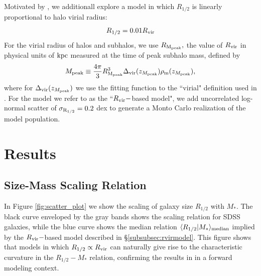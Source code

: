 \documentclass[usenatbib,usegraphicx,letterpaper]{mn2e}
\newcommand{\beq}{\begin{equation}}
\newcommand{\eeq}{\end{equation}}
\newcommand{\rhalf}{R_{1/2}}
\newcommand{\sigmarhalf}{\sigma_{\rm R_{1/2}}}
\newcommand{\mstar}{M_{\ast}}
\newcommand{\mpeak}{M_{\rm peak}}
\newcommand{\zpeak}{z_{M_{\rm peak}}}
\newcommand{\rvir}{R_{\rm vir}}
\newcommand{\rmpeak}{R_{\rm M_{peak}}}
\newcommand{\median}[2]{\langle{#1}\vert{#2}\rangle_{\rm median}}
\newcommand{\kpc}{{\rm kpc}}
\begin{document}
Motivated by \citet{kravtsov13}, we additionall explore a model in which $\rhalf$ is linearly proportional to halo virial radius:
\beq
\label{eq:fiducial_model}
\rhalf = 0.01\rvir
\eeq
For the virial radius of halos and subhalos, we use $\rmpeak,$ the value of $\rvir$ in physical units of $\kpc$ measured at the time of peak subhalo mass, defined by
\beq
\mpeak\equiv\frac{4\pi}{3}\rmpeak^{3}\Delta_{\rm vir}(\zpeak)\rho_{\rm m}(\zpeak),
\eeq
where for $\Delta_{\rm vir}(\zpeak)$ we use the fitting function to the ``virial" definition used in \citet{bryan_norman98}. For the model we refer to as the ``$\rvir-$based model", we add uncorrelated log-normal scatter of $\sigmarhalf=0.2$ dex to generate a Monto Carlo realization of the model population.

\section{Results}
\label{sec:results}

\subsection{Size-Mass Scaling Relation}
\label{subsec:one_point_function}

In Figure \ref{fig:scatter_plot} we show the scaling of galaxy size $\rhalf$ with $\mstar.$ The black curve enveloped by the gray bands shows the scaling relation for SDSS galaxies, while the blue curve shows the median relation  $\median{\rhalf}{\mstar}$ implied by the $\rvir-$based model described in \S\ref{subsubsec:rvirmodel}. This figure shows that models in which $\rhalf\propto\rvir$ can naturally give rise to the characteristic curvature in the $\rhalf-\mstar$ relation, confirming the results in \citet{kravtsov13} in a forward modeling context.
\end{document}
